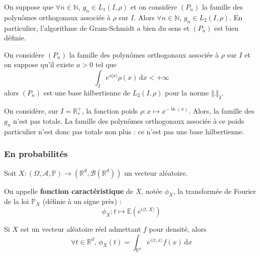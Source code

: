 
  \begin{lemma}
    On suppose que $\forall n \in \mathbb{N}$, $g_n \in L_1(I, \rho)$ et on considère $(P_n)$ la famille des polynômes orthogonaux associée à $\rho$ sur $I$. Alors $\forall n \in \mathbb{N}$, $g_n \in L_2(I, \rho)$. En particulier, l'algorithme de Gram-Schmidt a bien du sens et $(P_n)$ est bien définie.
  \end{lemma}


  \begin{application}
    On considère $(P_n)$ la famille des polynômes orthogonaux associée à $\rho$ sur $I$ et on suppose qu'il existe $a > 0$ tel que
    \[ \int_I e^{a \vert x \vert} \rho(x) \, \mathrm{d}x < +\infty \]
    alors $(P_n)$ est une base hilbertienne de $L_2(I, \rho)$ pour la norme $\Vert . \Vert_2$.
  \end{application}

  \begin{cexample}
    On considère, sur $I = \mathbb{R}^+_*$, la fonction poids $\rho : x \mapsto x^{-\ln(x)}$. Alors, la famille des $g_n$ n'est pas totale. La famille des polynômes orthogonaux associée à ce poids particulier n'est donc pas totale non plus : ce n'est pas une base hilbertienne.
  \end{cexample}

  \subsubsection{En probabilités}


  Soit $X : (\Omega, \mathcal{A}, \mathbb{P}) \rightarrow (\mathbb{R}^d, \mathcal{B}(\mathbb{R}^d))$ un vecteur aléatoire.

  \begin{definition}
    On appelle \textbf{fonction caractéristique} de $X$, notée $\phi_X$, la transformée de Fourier de la loi $\mathbb{P}_X$ (définie à un signe près) :
    \[ \phi_X : t \mapsto \mathbb{E}(e^{i \langle t, X \rangle}) \]
  \end{definition}


  \begin{remark}
    Si $X$ est un vecteur aléatoire réel admettant $f$ pour densité, alors
    \[ \forall t \in \mathbb{R}^d, \, \phi_X(t) = \int_{\mathbb{R}^d} e^{i \langle t, x \rangle} f(x) \, \mathrm{d}x \]
  \end{remark}

